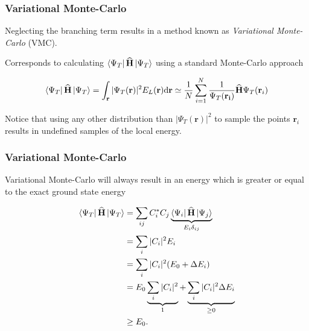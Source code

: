 \begin{frame}
 \frametitle{Variational Monte-Carlo}
 Neglecting the branching term results in a method known as \textit{Variational Monte-Carlo} (VMC).
 \shift
 
 Corresponds to calculating $\left< \Psi_T \right|{\bf\widehat{H}}\left| \Psi_T \right>$ using a standard Monte-Carlo approach
 
 \begin{equation}
  \left< \Psi_T \right|{\bf\widehat{H}}\left| \Psi_T \right> = \int_\mathbf{r} |\Psi_T(\mathbf{r})|^2 E_L(\mathbf{r})\mathrm{d}\mathbf{r} \simeq \frac{1}{N}\sum_{i=1}^N \frac{1}{\Psi_T(\mathbf{r_i})}{\bf\widehat{H}}\Psi_T(\mathbf{r}_i) 
 \end{equation}
  \shift
 
 Notice that using any other distribution than $|\Psi_T(\mathbf{r})|^2$ to sample the points $\mathbf{r}_i$ results in undefined samples of the local energy.

 
\end{frame}

\begin{frame}
 \frametitle{\textbf{Variational} Monte-Carlo}
 
 Variational Monte-Carlo will always result in an energy which is greater or equal to the exact ground state energy
 
 \begin{align*}
  \left< \Psi_T \right|{\bf\widehat{H}}\left| \Psi_T \right> &= \sum_{ij} C_i^\ast C_j \underbrace{\left< \Psi_i \right| {\bf\widehat{H}} \left| \Psi_j \right>}_{E_i\delta_{ij}} \\
                                 &= \sum_i |C_i|^2 E_i \\
                                 &= \sum_i |C_i|^2 (E_0 + \Delta E_i) \\
                                 &= E_0 \underbrace{\sum_i |C_i|^2}_{1} + \underbrace{\sum_i |C_i|^2\Delta E_i}_{\ge 0} \\
                                 &\ge E_0.
 \end{align*}
\end{frame}

